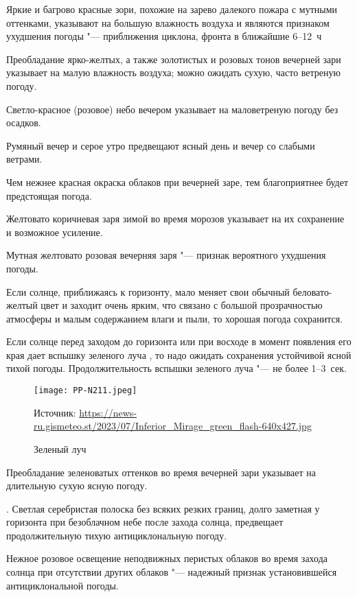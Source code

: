  Яркие и багрово красные зори, похожие на зарево далекого
пожара с мутными оттенками, указывают на большую влажность воздуха и
являются признаком ухудшения погоды "--- приближения циклона, фронта в
ближайшие 6--12~ч

 Преобладание ярко-желтых, а также золотистых и розовых тонов
вечерней зари указывает на малую влажность воздуха; можно ожидать
сухую, часто ветреную погоду.

 Светло-красное (розовое) небо вечером указывает на маловетреную
погоду без осадков.

 Румяный вечер и серое утро предвещают ясный день и вечер со
слабыми ветрами.

 Чем нежнее красная окраска облаков при вечерней заре, тем
благоприятнее будет предстоящая погода.

 Желтовато коричневая заря зимой во время морозов указывает на их
сохранение и возможное усиление.

 Мутная желтовато розовая вечерняя заря "--- признак вероятного
ухудшения погоды.

 Если солнце, приближаясь к горизонту, мало меняет свои обычный
беловато-желтый цвет и заходит очень ярким, что связано с большой
прозрачностью атмосферы и малым содержанием влаги и пыли, то хорошая
погода сохранится.

 Если солнце перед заходом до горизонта или при восходе в момент
появления его края дает вспышку зеленого луча , то надо ожидать
сохранения устойчивой ясной тихой погоды. Продолжительность вспышки
зеленого луча "--- не более 1--3~сек.

\begin{figure}[htb]
  \centering{}
  \texttt{[image: PP-N211.jpeg]}
  \caption{Зеленый луч}
  \label{fig:pp-n211}
  \scriptsize
  \centering{}Источник: \url{https://news-ru.gismeteo.st/2023/07/Inferior_Mirage_green_flash-640x427.jpg}
\end{figure}

 Преобладание зеленоватых оттенков во время вечерней зари
указывает на длительную сухую ясную погоду.

. Светлая серебристая полоска без всяких резких границ, долго
заметная у горизонта при безоблачном небе после захода солнца,
предвещает продолжительную тихую антициклональную погоду.

 Нежное розовое освещение неподвижных перистых облаков во время
захода солнца при отсутствии других облаков "--- надежный признак
установившейся антициклональной погоды.

